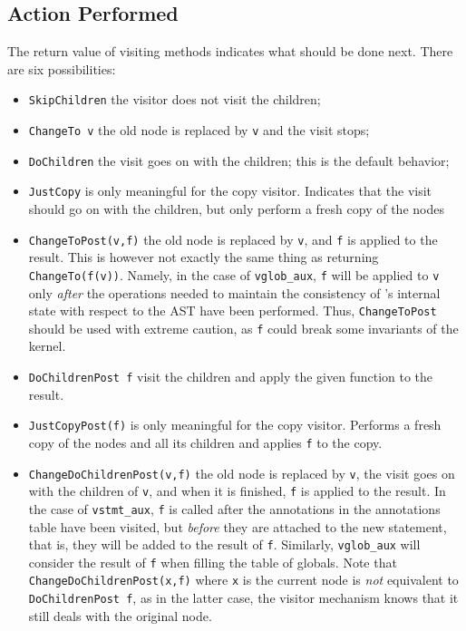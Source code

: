 \subsection{Action Performed}\label{adv:sec:action-performed}

The return value of visiting methods indicates what should be done
next. There are six possibilities:
\begin{itemize}
\item \verb+SkipChildren+ the visitor
  does not visit the children;
\item \verb+ChangeTo v+ the old node is
  replaced by \verb+v+ and the visit stops;
\item \verb+DoChildren+ the visit goes
  on with the children; this is the default behavior;
\item \verb+JustCopy+ is only meaningful
  for the copy visitor. Indicates that the visit should go on with the children,
  but only perform a fresh copy of the nodes
\item \verb+ChangeToPost(v,f)+ the old
  node is replaced by \verb+v+, and \verb+f+ is applied to the result. This is
  however not exactly the same thing as returning \verb+ChangeTo(f(v))+. Namely,
  in the case of \verb+vglob_aux+, \verb+f+ will be applied to \verb+v+ only
  \emph{after} the operations needed to maintain the consistency of \framac's
  internal state with respect to the AST have been performed.  Thus,
  \verb+ChangeToPost+ should be used with extreme caution, as \verb+f+ could
  break some invariants of the kernel.
\item \verb+DoChildrenPost f+
  visit the children and apply the given function to the result.
\item \verb+JustCopyPost(f)+
  is only
  meaningful for the copy visitor. Performs a fresh copy of the nodes
  and all its children and applies \verb+f+ to the copy.
\item
  \verb+ChangeDoChildrenPost(v,f)+%
  the old node is replaced by \verb+v+, the visit goes on with the children of
  \verb+v+, and when it is finished, \verb+f+ is applied to the result. In the
  case of \verb+vstmt_aux+, \verb+f+ is called after the annotations in the
  annotations table have been visited, but \emph{before} they are attached to
  the new statement, that is, they will be added to the result of
  \verb+f+. Similarly, \verb+vglob_aux+ will consider the
   result of \verb+f+ when filling the table of globals. Note that
   \verb+ChangeDoChildrenPost(x,f)+ where \verb+x+ is the current node
   is \textit{not} equivalent to \verb+DoChildrenPost f+, as in the latter
   case, the visitor mechanism knows that it still deals with the original node.
\end{itemize}

